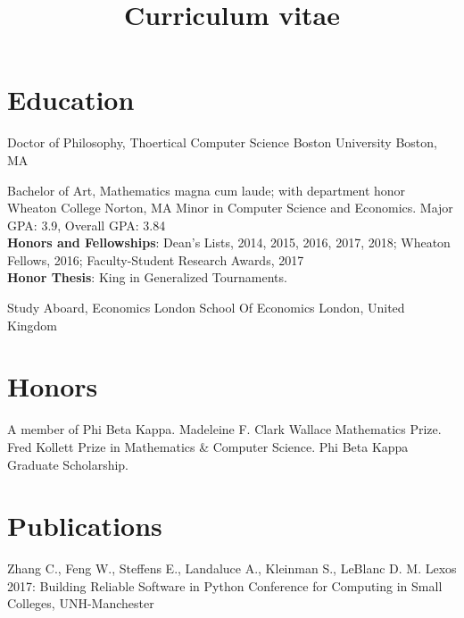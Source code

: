 \documentclass[11pt,a4paper,roman]{moderncv}        %
\title{Curriculum vitae}
\begin{document}

\makecvtitle{}

\setlength{\parskip}{2.5px}
\linespread{1.3}
\selectfont


\section{Education}

{Doctor of Philosophy, Thoertical Computer Science} {}
{Boston University}
{Boston, MA}
{}  %

{Bachelor of Art, Mathematics} {magna cum laude; with department honor}
{Wheaton College}
{Norton, MA}
{Minor in Computer Science and Economics.
Major GPA\@: 3.9, Overall GPA\@: 3.84\\
\textbf{Honors and Fellowships}: Dean's Lists, 2014, 2015, 2016, 2017, 2018;
Wheaton Fellows, 2016;
Faculty-Student Research Awards, 2017\\
\textbf{Honor Thesis}: King in Generalized Tournaments.}

{Study Aboard, Economics} {}
{London School Of Economics}
{London, United Kingdom}
{}  %




\section{Honors}
 {A member of Phi Beta Kappa.}
 {
  Madeleine F. Clark Wallace Mathematics Prize. \newline
  Fred Kollett Prize in Mathematics \& Computer Science. \newline
  Phi Beta Kappa Graduate Scholarship.
}



\section{Publications}

{Zhang C., Feng W., Steffens E., Landaluce A., Kleinman S., LeBlanc D. M.}
{Lexos 2017: Building Reliable Software in Python}
{Conference for Computing in Small Colleges, UNH-Manchester}
{}{}
\end{document}
